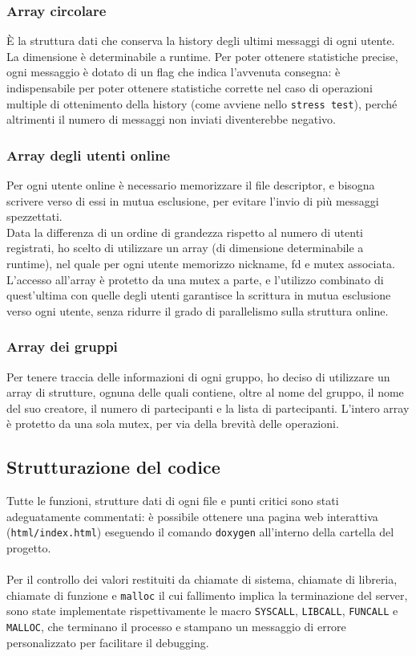 \subsubsection{Array circolare}
È la struttura dati che conserva la history degli ultimi messaggi di ogni utente. La dimensione è determinabile a runtime. Per poter ottenere statistiche precise, ogni messaggio è dotato di un flag che indica l'avvenuta consegna: è indispensabile per poter ottenere statistiche corrette nel caso di operazioni multiple di ottenimento della history (come avviene nello \texttt{stress test}), perché altrimenti il numero di messaggi non inviati diventerebbe negativo.

\subsubsection{Array degli utenti online}
Per ogni utente online è necessario memorizzare il file descriptor, e bisogna scrivere verso di essi in mutua esclusione, per evitare l'invio di più messaggi spezzettati.\\
Data la differenza di un ordine di grandezza rispetto al numero di utenti registrati, ho scelto di utilizzare un array (di dimensione determinabile a runtime), nel quale per ogni utente memorizzo nickname, fd e mutex associata. L'accesso all'array è protetto da una mutex a parte, e l'utilizzo combinato di quest'ultima con quelle degli utenti garantisce la scrittura in mutua esclusione verso ogni utente, senza ridurre il grado di parallelismo sulla struttura online.

\subsubsection{Array dei gruppi}
Per tenere traccia delle informazioni di ogni gruppo, ho deciso di utilizzare un array di strutture, ognuna delle quali contiene, oltre al nome del gruppo, il nome del suo creatore, il numero di partecipanti e la lista di partecipanti. L'intero array è protetto da una sola mutex, per via della brevità delle operazioni.


\subsection{Strutturazione del codice}
Tutte le funzioni, strutture dati di ogni file e punti critici sono stati adeguatamente commentati: è possibile ottenere una pagina web interattiva (\texttt{html/index.html}) eseguendo il comando \texttt{doxygen} all'interno della cartella del progetto.\\\\
Per il controllo dei valori restituiti da chiamate di sistema, chiamate di libreria, chiamate di funzione e \texttt{malloc} il cui fallimento implica la terminazione del server, sono state implementate rispettivamente le macro \texttt{SYSCALL}, \texttt{LIBCALL}, \texttt{FUNCALL} e \texttt{MALLOC}, che terminano il processo e stampano un messaggio di errore personalizzato per facilitare il debugging.

